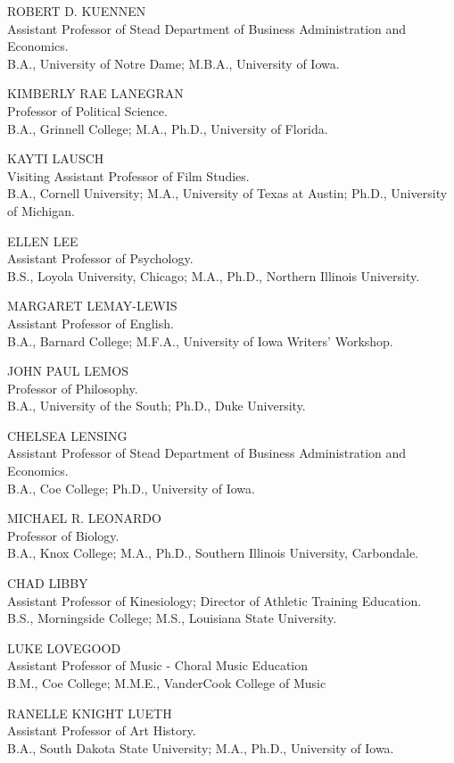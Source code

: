 \documentclass[
  letterpaper,
]{scrbook}
\begin{document}
ROBERT D. KUENNEN\\
Assistant Professor of Stead Department of Business Administration and
Economics.\\
B.A., University of Notre Dame; M.B.A., University of Iowa.

KIMBERLY RAE LANEGRAN\\
Professor of Political Science.\\
B.A., Grinnell College; M.A., Ph.D., University of Florida.

KAYTI LAUSCH\\
Visiting Assistant Professor of Film Studies.\\
B.A., Cornell University; M.A., University of Texas at Austin; Ph.D.,
University of Michigan.

ELLEN LEE\\
Assistant Professor of Psychology.\\
B.S., Loyola University, Chicago; M.A., Ph.D., Northern Illinois
University.

MARGARET LEMAY-LEWIS\\
Assistant Professor of English.\\
B.A., Barnard College; M.F.A., University of Iowa Writers' Workshop.

JOHN PAUL LEMOS\\
Professor of Philosophy.\\
B.A., University of the South; Ph.D., Duke University.

CHELSEA LENSING\\
Assistant Professor of Stead Department of Business Administration and
Economics.\\
B.A., Coe College; Ph.D., University of Iowa.

MICHAEL R. LEONARDO\\
Professor of Biology.\\
B.A., Knox College; M.A., Ph.D., Southern Illinois University,
Carbondale.

CHAD LIBBY\\
Assistant Professor of Kinesiology; Director of Athletic Training
Education.\\
B.S., Morningside College; M.S., Louisiana State University.

LUKE LOVEGOOD\\
Assistant Professor of Music - Choral Music Education\\
B.M., Coe College; M.M.E., VanderCook College of Music

RANELLE KNIGHT LUETH\\
Assistant Professor of Art History.\\
B.A., South Dakota State University; M.A., Ph.D., University of Iowa.
\end{document}
